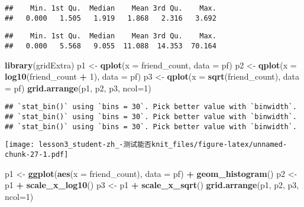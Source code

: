 \documentclass[]{article}
\newenvironment{Shaded}{\begin{snugshade}}{\end{snugshade}}
\newcommand{\DataTypeTok}[1]{\textcolor[rgb]{0.13,0.29,0.53}{#1}}
\newcommand{\DecValTok}[1]{\textcolor[rgb]{0.00,0.00,0.81}{#1}}
\newcommand{\KeywordTok}[1]{\textcolor[rgb]{0.13,0.29,0.53}{\textbf{#1}}}
\newcommand{\NormalTok}[1]{#1}
\newcommand{\OperatorTok}[1]{\textcolor[rgb]{0.81,0.36,0.00}{\textbf{#1}}}
\newcommand{\StringTok}[1]{\textcolor[rgb]{0.31,0.60,0.02}{#1}}
\begin{document}
\begin{verbatim}
##    Min. 1st Qu.  Median    Mean 3rd Qu.    Max. 
##   0.000   1.505   1.919   1.868   2.316   3.692
\end{verbatim}

\begin{Shaded}
\end{Shaded}

\begin{verbatim}
##    Min. 1st Qu.  Median    Mean 3rd Qu.    Max. 
##   0.000   5.568   9.055  11.088  14.353  70.164
\end{verbatim}

\begin{Shaded}
\begin{Highlighting}[]
\KeywordTok{library}\NormalTok{(gridExtra)}
\NormalTok{p1 <-}\StringTok{ }\KeywordTok{qplot}\NormalTok{(}\DataTypeTok{x =}\NormalTok{ friend_count, }\DataTypeTok{data =}\NormalTok{ pf)}
\NormalTok{p2 <-}\StringTok{ }\KeywordTok{qplot}\NormalTok{(}\DataTypeTok{x =} \KeywordTok{log10}\NormalTok{(friend_count }\OperatorTok{+}\StringTok{ }\DecValTok{1}\NormalTok{), }\DataTypeTok{data =}\NormalTok{ pf)}
\NormalTok{p3 <-}\StringTok{ }\KeywordTok{qplot}\NormalTok{(}\DataTypeTok{x =} \KeywordTok{sqrt}\NormalTok{(friend_count), }\DataTypeTok{data =}\NormalTok{ pf) }
\KeywordTok{grid.arrange}\NormalTok{(p1, p2, p3, }\DataTypeTok{ncol=}\DecValTok{1}\NormalTok{)}
\end{Highlighting}
\end{Shaded}

\begin{verbatim}
## `stat_bin()` using `bins = 30`. Pick better value with `binwidth`.
## `stat_bin()` using `bins = 30`. Pick better value with `binwidth`.
## `stat_bin()` using `bins = 30`. Pick better value with `binwidth`.
\end{verbatim}

\texttt{[image: lesson3\_student-zh\_-测试能否knit\_files/figure-latex/unnamed-chunk-27-1.pdf]}

\begin{Shaded}
\begin{Highlighting}[]
\NormalTok{p1 <-}\StringTok{ }\KeywordTok{ggplot}\NormalTok{(}\KeywordTok{aes}\NormalTok{(}\DataTypeTok{x =}\NormalTok{ friend_count), }\DataTypeTok{data =}\NormalTok{ pf) }\OperatorTok{+}\StringTok{ }\KeywordTok{geom_histogram}\NormalTok{()}
\NormalTok{p2 <-}\StringTok{ }\NormalTok{p1 }\OperatorTok{+}\StringTok{ }\KeywordTok{scale_x_log10}\NormalTok{()}
\NormalTok{p3 <-}\StringTok{ }\NormalTok{p1 }\OperatorTok{+}\StringTok{ }\KeywordTok{scale_x_sqrt}\NormalTok{()}
\KeywordTok{grid.arrange}\NormalTok{(p1, p2, p3, }\DataTypeTok{ncol=}\DecValTok{1}\NormalTok{)}
\end{Highlighting}
\end{Shaded}
\end{document}
